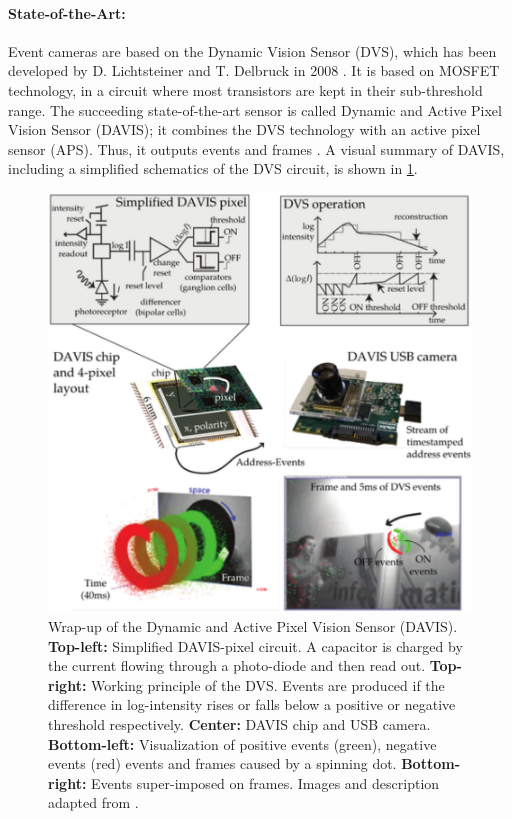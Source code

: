 \documentclass[10pt,twocolumn,letterpaper]{article}
\begin{document}
\paragraph{State-of-the-Art:}
Event cameras are based on the Dynamic Vision Sensor (DVS), which has been developed by D. Lichtsteiner and T. Delbruck in 2008 \cite{DVSoriginal}. It is based on MOSFET technology, in a circuit where most transistors are kept in their sub-threshold range. The succeeding state-of-the-art sensor is called Dynamic and Active Pixel Vision Sensor (DAVIS); it combines the DVS technology with an active pixel sensor (APS). Thus, it outputs events and frames \cite{DAVIS}. A visual summary of DAVIS, including a simplified schematics of the DVS circuit, is shown in \cref{fig:davis}. 

\begin{figure}[h!]
	\centering
    \includegraphics[width=0.99\linewidth]{figures/davis.png}    
    \caption{Wrap-up of the Dynamic and Active Pixel Vision Sensor (DAVIS). \textbf{Top-left:} Simplified DAVIS-pixel circuit. A capacitor is charged by the current flowing through a photo-diode and then read out.  \textbf{Top-right:} Working principle of the DVS. Events are produced if the difference in log-intensity rises or falls below a positive or negative threshold respectively. \textbf{Center:} DAVIS chip and USB camera. \textbf{Bottom-left:} Visualization of positive events (green), negative events (red) events and frames caused by a spinning dot.  \textbf{Bottom-right:} Events super-imposed on frames. Images and description adapted from \cite{EventVisionReview}.}
    \label{fig:davis}
\end{figure}
\end{document}
